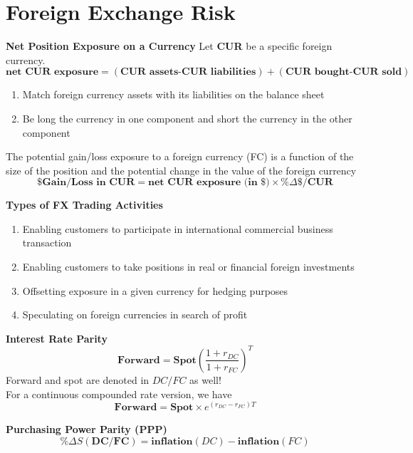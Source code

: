 \documentclass[11pt,fleqn]{book} %
\numberwithin{equation}{section} %
\numberwithin{figure}{section} %
\numberwithin{table}{section} %
\begin{document}
\chapter{Foreign Exchange Risk}
 \begin{definition}\textbf{Net Position Exposure on a Currency} Let \textbf{CUR} be a specific foreign currency.
    $$
    \textbf{net CUR exposure}=(\textbf{CUR assets-CUR liabilities})+(\textbf{CUR bought-CUR sold})
    $$
 \end{definition}
 \begin{remark}
    \begin{enumerate}
        \item Match foreign currency assets with its liabilities on the balance sheet
        \item Be long the currency in one component and short the currency in the other component
    \end{enumerate}
 \end{remark}
 \begin{definition} The potential gain/loss exposure to a foreign currency (FC) is a function of 
    the size of the position and the potential change in the value of the foreign currency
    $$
    \textbf{\$ Gain/Loss in CUR}=\textbf{net CUR exposure (in \$)}\times\textbf{\%$\Delta\$/$CUR}
    $$
 \end{definition}
 \begin{definition}\textbf{Types of FX Trading Activities}
    \begin{enumerate}
        \item Enabling customers to participate in international commercial
        business transaction
        \item Enabling customers to take positions in real or financial foreign investments
        \item Offsetting exposure in a given currency for hedging purposes
        \item Speculating on foreign currencies in search of profit
    \end{enumerate}
 \end{definition}
 \begin{theorem}\textbf{Interest Rate Parity}
    $$
    \textbf{Forward}=\textbf{Spot}\left(\frac{1+r_{DC}}{1+r_{FC}}\right)^T
    $$
    Forward and spot are denoted in $DC/FC$ as well!\\
    For a continuous compounded rate version, we have
    $$
    \textbf{Forward}=\textbf{Spot}\times e^{\left(r_{DC}-r_{FC}\right)T}
    $$
 \end{theorem}
 \begin{theorem}\textbf{Purchasing Power Parity (PPP)}
    $$
    \%\Delta S(\textbf{DC/FC})=\textbf{inflation}(DC)-\textbf{inflation}(FC)
    $$
 \end{theorem}
\end{document}
